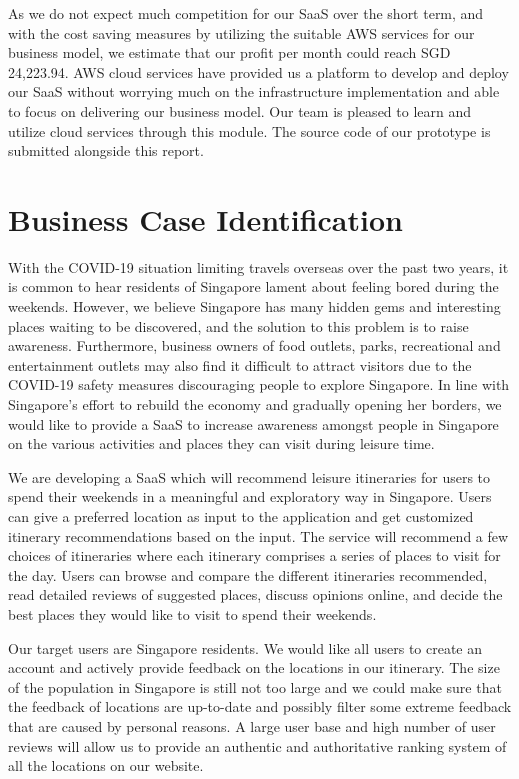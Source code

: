 \documentclass[12pt,a4paper]{article}
\begin{document}
As we do not expect much competition for our SaaS over the short term, and with the cost saving measures by utilizing the suitable AWS services for our business model, we estimate that our profit per month could reach SGD 24,223.94. AWS cloud services have provided us a platform to develop and deploy our SaaS without worrying much on the infrastructure implementation and able to focus on delivering our business model. Our team is pleased to learn and utilize cloud services through this module. The source code of our prototype is submitted alongside this report.



\section{Business Case Identification}

With the COVID-19 situation limiting travels overseas over the past two years, it is common to hear residents of Singapore lament about feeling bored during the weekends. However, we believe Singapore has many hidden gems and interesting places waiting to be discovered, and the solution to this problem is to raise awareness. Furthermore, business owners of food outlets, parks, recreational and entertainment outlets may also find it difficult to attract visitors due to the COVID-19 safety measures discouraging people to explore Singapore. In line with Singapore’s effort to rebuild the economy and gradually opening her borders, we would like to provide a SaaS to increase awareness amongst people in Singapore on the various activities and places they can visit during leisure time.

We are developing a SaaS which will recommend leisure itineraries for users to spend their weekends in a meaningful and exploratory way in Singapore. Users can give a preferred location as input to the application and get customized itinerary recommendations based on the input. The service will recommend a few choices of itineraries where each itinerary comprises a series of places to visit for the day. Users can browse and compare the different itineraries recommended, read detailed reviews of suggested places, discuss opinions online, and decide the best places they would like to visit to spend their weekends.

Our target users are Singapore residents. We would like all users to create an account and actively provide feedback on the locations in our itinerary. The size of the population in Singapore is still not too large and we could make sure that the feedback of locations are up-to-date and possibly filter some extreme feedback that are caused by personal reasons. A large user base and high number of user reviews will allow us to provide an authentic and authoritative ranking system of all the locations on our website. 
\end{document}
